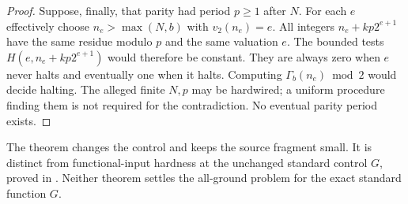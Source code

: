 \begin{proof}
Suppose, finally, that parity had period $p\ge1$ after $N$.
For each $e$ effectively choose $n_e>\max(N,b)$ with $v_2(n_e)=e$.
All integers $n_e+kp2^{e+1}$ have the same residue modulo $p$ and
the same valuation $e$. The bounded tests
$H(e,n_e+kp2^{e+1})$ would therefore be constant. They are always
zero when $e$ never halts and eventually one when it halts.
Computing $\Gamma_b(n_e)\bmod2$ would decide halting. The alleged
finite $N,p$ may be hardwired; a uniform procedure finding them is
not required for the contradiction. No eventual parity period exists.
\end{proof}

The theorem changes the control and keeps the source fragment small.
It is distinct from functional-input hardness at the unchanged standard
control $G$, proved in \cite{groundcomparison}. Neither theorem settles the
all-ground problem for the exact standard function $G$.
